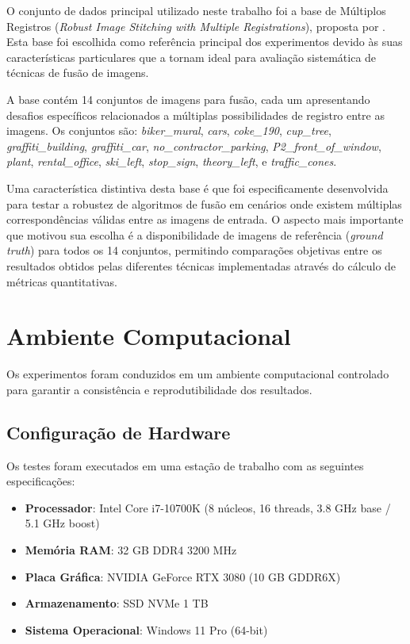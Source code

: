 O conjunto de dados principal utilizado neste trabalho foi a base de Múltiplos Registros (\textit{Robust Image Stitching with Multiple Registrations}), proposta por . Esta base foi escolhida como referência principal dos experimentos devido às suas características particulares que a tornam ideal para avaliação sistemática de técnicas de fusão de imagens.

A base contém 14 conjuntos de imagens para fusão, cada um apresentando desafios específicos relacionados a múltiplas possibilidades de registro entre as imagens. Os conjuntos são: \textit{biker\_mural}, \textit{cars}, \textit{coke\_190}, \textit{cup\_tree}, \textit{graffiti\_building}, \textit{graffiti\_car}, \textit{no\_contractor\_parking}, \textit{P2\_front\_of\_window}, \textit{plant}, \textit{rental\_office}, \textit{ski\_left}, \textit{stop\_sign}, \textit{theory\_left}, e \textit{traffic\_cones}.

Uma característica distintiva desta base é que foi especificamente desenvolvida para testar a robustez de algoritmos de fusão em cenários onde existem múltiplas correspondências válidas entre as imagens de entrada. O aspecto mais importante que motivou sua escolha é a disponibilidade de imagens de referência (\textit{ground truth}) para todos os 14 conjuntos, permitindo comparações objetivas entre os resultados obtidos pelas diferentes técnicas implementadas através do cálculo de métricas quantitativas.

\section{Ambiente Computacional}

Os experimentos foram conduzidos em um ambiente computacional controlado para garantir a consistência e reprodutibilidade dos resultados.

\subsection{Configuração de Hardware}

Os testes foram executados em uma estação de trabalho com as seguintes especificações:

\begin{itemize}
    \item \textbf{Processador}: Intel Core i7-10700K (8 núcleos, 16 threads, 3.8 GHz base / 5.1 GHz boost)
    \item \textbf{Memória RAM}: 32 GB DDR4 3200 MHz
    \item \textbf{Placa Gráfica}: NVIDIA GeForce RTX 3080 (10 GB GDDR6X)
    \item \textbf{Armazenamento}: SSD NVMe 1 TB
    \item \textbf{Sistema Operacional}: Windows 11 Pro (64-bit)
\end{itemize}

